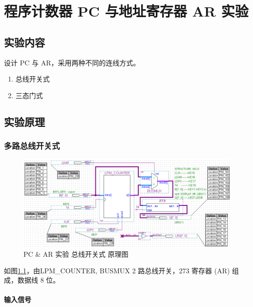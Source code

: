 \chapter{程序计数器 PC 与地址寄存器 AR 实验}
\section{实验内容}

设计 PC 与 AR，采用两种不同的连线方式。

\begin{enumerate}
    \item 总线开关式
    \item 三态门式
\end{enumerate}

\section{实验原理}

\subsection{多路总线开关式}

\begin{figure}[H]
\centering
\includegraphics[width=\textwidth]{images/prin4_1.png}
\caption{PC \& AR 实验 总线开关式 原理图}
\label{fig:prin4_1}
\end{figure}

如图\ref{fig:prin4_1}，由LPM\_COUNTER, BUSMUX 2 路总线开关，273 寄存器 (AR) 组成，数据线 8 位。

\subsubsection{输入信号}

